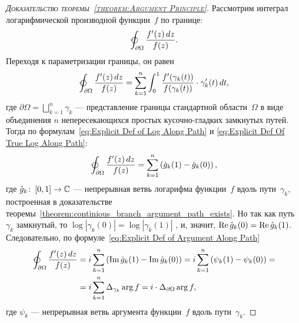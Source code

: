 \documentclass[../complex-analysis.tex]{subfiles}
\begin{document}
\begin{proof}[\normalfont\textsc{Доказательство теоремы~\ref{theorem:Argument Principle}}]
 Рассмотрим интеграл логарифмической производной функции~$ f $ по границе:
 \begin{align*}
  \varointctrclockwise_{\partial\Omega}  \frac{f'(z)\,dz}{f(z)}.
 \end{align*} Переходя к параметризации границы, он равен
 \begin{align*}
  \varointctrclockwise_{\partial\Omega} \frac{f'(z)\,dz}{f(z)} = \sum_{k=1}^{n} \int_{0}^{1} \frac{f'(\gamma_k(t))}{f(\gamma_k(t))} \cdot \gamma_k'(t)\,dt,
 \end{align*} где $ \partial\Omega = \bigsqcup_{k=1}^{n} \gamma_k $  --- представление границы стандартной области~$ \Omega $ в виде объединения $ n $ непересекающихся простых кусочно-гладких замкнутых путей. Тогда по формулам~\eqref{eq:Explicit Def of Log Along Path} и \eqref{eq:Explicit Def Of True Log Along Path}:
 \begin{align*}
  \varointctrclockwise_{\partial\Omega} \frac{f'(z)\,dz}{f(z)} = \sum_{k=1}^{n} \left( \hat g_k(1) - \hat g_k(0) \right),
 \end{align*} где $ \hat g_k \colon\,[0,1] \to \mathbb{C} $ --- непрерывная ветвь логарифма функции~$ f $ вдоль пути~$ \gamma_k $, построенная в доказательстве теоремы~\ref{theorem:continious_branch_argument_path_exists}. Но так как путь $ \gamma_k $ замкнутый, то $ \log \left| \gamma_k(0) \right| = \log \left| \gamma_k(1) \right| $ , и, значит, $ \operatorname{Re} \hat g_k(0) = \operatorname{Re} \hat g_k(1) $. Следовательно, по формуле~\eqref{eq:Explicit Def of Argument Along Path}
 \begin{align}
  \begin{aligned}
   \label{eq:Logarithmic Derivative Is Delta Arg:Argument Principle}
   \varointctrclockwise_{\partial\Omega} \frac{f'(z)\,dz}{f(z)} &= i\sum_{k=1}^{n} \left( \Imaginary \hat g_k(1) - \Imaginary \hat g_k(0) \right) = i \sum_{k=1}^{n} \left( \psi_k(1) - \psi_k(0) \right) = \\
   &= i \sum_{k=1}^{n} \Delta_{\gamma_k} \arg f = i \cdot \Delta_{\partial\Omega} \arg f,
  \end{aligned}
 \end{align} где $ \psi_k $ --- непрерывная ветвь аргумента функции~$ f $ вдоль пути~$ \gamma_k $.


\end{proof}
\end{document}
